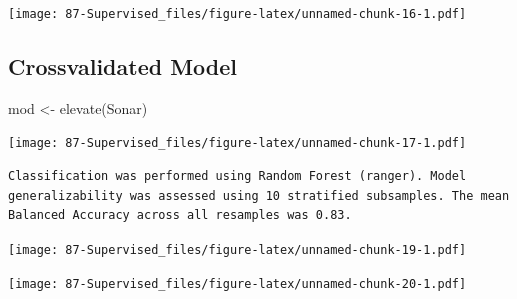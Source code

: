\documentclass[
]{book}
\newenvironment{Shaded}{\begin{snugshade}}{\end{snugshade}}
\newcommand{\FunctionTok}[1]{\textcolor[rgb]{0.00,0.00,0.00}{#1}}
\newcommand{\NormalTok}[1]{#1}
\newcommand{\OtherTok}[1]{\textcolor[rgb]{0.56,0.35,0.01}{#1}}
\newcommand{\SpecialCharTok}[1]{\textcolor[rgb]{0.00,0.00,0.00}{#1}}
\begin{document}
\texttt{[image: 87-Supervised\_files/figure-latex/unnamed-chunk-16-1.pdf]}

\hypertarget{crossvalidated-model-1}{%
\subsection{Crossvalidated Model}\label{crossvalidated-model-1}}

\begin{Shaded}
\begin{Highlighting}[]
\NormalTok{mod }\OtherTok{\textless{}{-}} \FunctionTok{elevate}\NormalTok{(Sonar)}
\end{Highlighting}
\end{Shaded}

\texttt{[image: 87-Supervised\_files/figure-latex/unnamed-chunk-17-1.pdf]}

\begin{Shaded}
\end{Shaded}

\begin{verbatim}
Classification was performed using Random Forest (ranger). Model generalizability was assessed using 10 stratified subsamples. The mean Balanced Accuracy across all resamples was 0.83.
\end{verbatim}

\begin{Shaded}
\end{Shaded}

\texttt{[image: 87-Supervised\_files/figure-latex/unnamed-chunk-19-1.pdf]}

\begin{Shaded}
\end{Shaded}

\texttt{[image: 87-Supervised\_files/figure-latex/unnamed-chunk-20-1.pdf]}

\begin{Shaded}
\end{Shaded}
\end{document}
